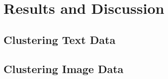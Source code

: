 \chapter{Results and Discussion}
\label{sec:results}

\section{Clustering Text Data}

\section{Clustering Image Data}